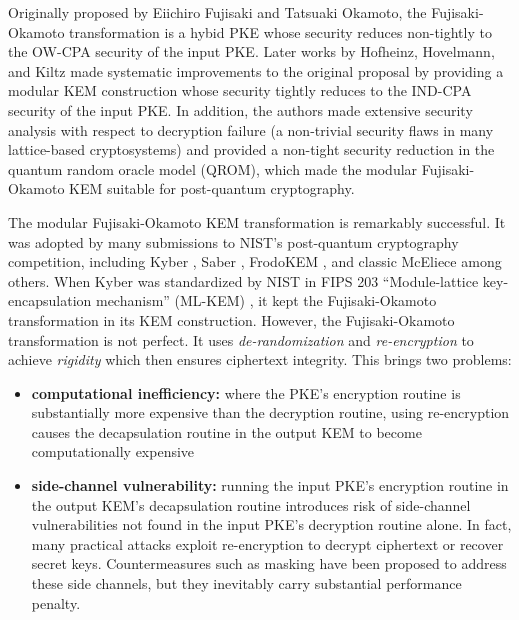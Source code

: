 \documentclass[journal=tches,submission]{iacrtrans}
\begin{document}
Originally proposed by Eiichiro Fujisaki and Tatsuaki Okamoto, the Fujisaki-Okamoto transformation \cite{DBLP:conf/crypto/FujisakiO99}\cite{DBLP:journals/joc/FujisakiO13} is a hybid PKE whose security reduces non-tightly to the OW-CPA security of the input PKE. Later works by Hofheinz, Hovelmann, and Kiltz \cite{DBLP:conf/tcc/HofheinzHK17}\cite{DBLP:conf/asiacrypt/HovelmannsHM22} made systematic improvements to the original proposal by providing a modular KEM construction whose security tightly reduces to the IND-CPA security of the input PKE. In addition, the authors made extensive security analysis with respect to decryption failure (a non-trivial security flaws in many lattice-based cryptosystems) and provided a non-tight security reduction in the quantum random oracle model (QROM), which made the modular Fujisaki-Okamoto KEM suitable for post-quantum cryptography.

The modular Fujisaki-Okamoto KEM transformation is remarkably successful. It was adopted by many submissions to NIST's post-quantum cryptography competition, including Kyber \cite{DBLP:conf/eurosp/BosDKLLSSSS18}, Saber \cite{DBLP:conf/africacrypt/DAnversKRV18}, FrodoKEM \cite{DBLP:conf/ccs/BosCDMNNRS16}, and classic McEliece \cite{classicmceliecespec} among others. When Kyber was standardized by NIST in FIPS 203 ``Module-lattice key-encapsulation mechanism'' (ML-KEM) \cite{FIPS203}, it kept the Fujisaki-Okamoto transformation in its KEM construction. However, the Fujisaki-Okamoto transformation is not perfect. It uses \emph{de-randomization} and \emph{re-encryption} to achieve \emph{rigidity} \cite{bernstein2018towards} which then ensures ciphertext integrity. This brings two problems: \begin{itemize}
    \item \textbf{computational inefficiency:} where the PKE's encryption routine is substantially more expensive than the decryption routine, using re-encryption causes the decapsulation routine in the output KEM to become computationally expensive
    \item \textbf{side-channel vulnerability:} running the input PKE's encryption routine in the output KEM's decapsulation routine introduces risk of side-channel vulnerabilities not found in the input PKE's decryption routine alone. In fact, many practical attacks \cite{ueno2022curse}\cite{ravi2019generic} exploit re-encryption to decrypt ciphertext or recover secret keys. Countermeasures such as masking have been proposed to address these side channels, but they inevitably carry substantial performance penalty.
\end{itemize} 
\end{document}
